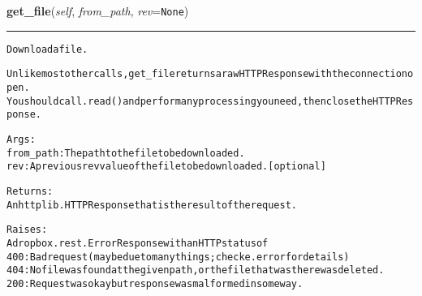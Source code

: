     \label{lib:dropbox:DropboxClient:get_file}

    \vspace{0.5ex}

\hspace{.8\funcindent}\begin{boxedminipage}{\funcwidth}

    \raggedright \textbf{get\_file}(\textit{self}, \textit{from\_path}, \textit{rev}={\tt None})

    \vspace{-1.5ex}

    \rule{\textwidth}{0.5\fboxrule}
\setlength{\parskip}{2ex}
\begin{alltt}
Download a file.

Unlike most other calls, get\_file returns a raw HTTPResponse with the connection open.
You should call .read() and perform any processing you need, then close the HTTPResponse.

Args:
    from\_path: The path to the file to be downloaded.
    rev: A previous rev value of the file to be downloaded. [optional]

Returns:
    An httplib.HTTPResponse that is the result of the request.

Raises:
    A dropbox.rest.ErrorResponse with an HTTP status of
       400: Bad request (may be due to many things; check e.error for details)
       404: No file was found at the given path, or the file that was there was deleted.
       200: Request was okay but response was malformed in some way.
\end{alltt}

\setlength{\parskip}{1ex}
    \end{boxedminipage}

    \label{lib:dropbox:DropboxClient:get_file_and_metadata}

    \vspace{0.5ex}

